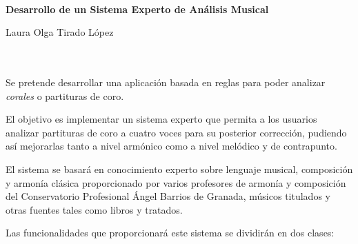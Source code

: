 \documentclass[a4paper, 12pt]{report} %
\makeatletter
\numberwithin{equation}{section} %
\numberwithin{figure}{section} %
\numberwithin{table}{section} %
\newcommand\frontmatter{%
    \cleardoublepage
  \pagenumbering{roman}}
\makeatother
\begin{document}

\newpage
\thispagestyle{empty}
\
\newpage
\thispagestyle{empty}
\
\newpage
\thispagestyle{empty}
\

\frontmatter

\thispagestyle{empty}

\begin{center}
{\large\bfseries Desarrollo de un Sistema Experto de Análisis Musical}\\
\end{center}
\begin{center}
Laura Olga Tirado López\\
\end{center}

\\

\vspace{0.7cm}
\noindent{\textbf{Resumen}}\\

Se pretende desarrollar una aplicación basada en reglas para poder analizar \textit{corales} o partituras de coro.

\bigskip

El objetivo es implementar un sistema experto que permita a los usuarios analizar partituras de coro a cuatro voces para su posterior corrección, pudiendo así mejorarlas tanto a nivel armónico como a nivel melódico y de contrapunto.

\bigskip

El sistema se basará en conocimiento experto sobre lenguaje musical, composición y armonía clásica proporcionado por varios profesores de armonía y composición del Conservatorio Profesional Ángel Barrios de Granada, músicos titulados y otras fuentes tales como libros y tratados. 

\bigskip

Las funcionalidades que proporcionará este sistema se dividirán en dos clases:
\end{document}
